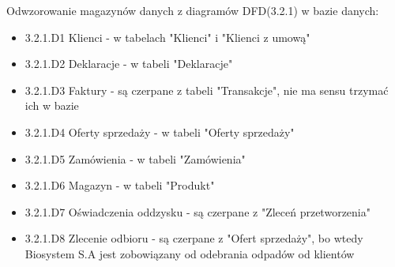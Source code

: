 Odwzorowanie magazynów danych z diagramów DFD(3.2.1) w bazie danych:
\begin{itemize}
	\item 3.2.1.D1 Klienci - w tabelach "Klienci" i "Klienci z umową"
	\item 3.2.1.D2 Deklaracje - w tabeli "Deklaracje"
	\item 3.2.1.D3 Faktury - są czerpane z tabeli "Transakcje", nie ma sensu trzymać ich w bazie
	\item 3.2.1.D4 Oferty sprzedaży - w tabeli "Oferty sprzedaży"
	\item 3.2.1.D5 Zamówienia - w tabeli "Zamówienia"
	\item 3.2.1.D6 Magazyn - w tabeli "Produkt"
	\item 3.2.1.D7 Oświadczenia oddzysku - są czerpane z "Zleceń przetworzenia"
	\item 3.2.1.D8 Zlecenie odbioru - są czerpane z "Ofert sprzedaży", bo wtedy Biosystem S.A jest zobowiązany od odebrania odpadów od klientów
\end{itemize}



